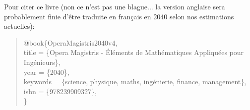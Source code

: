 	Pour citer ce livre (non ce n'est pas une blague... la version anglaise sera probablement finie d'être traduite en français en 2040 selon nos estimations actuelles):
	\begin{quote}
	\noindent @book\{OperaMagistris2040v4, \\
		  title =        \{Opera Magistris - \'El\'ements de Math\'ematiques Appliqu\'ees pour Ing\'enieurs\}, \\
		  year =         \{2040\}, \\
		  keywords =     \{science, physique, maths, ing\'enierie, finance, management\}, \\
		  isbn =          \{978239909327\},\\
	\}
	\end{quote}